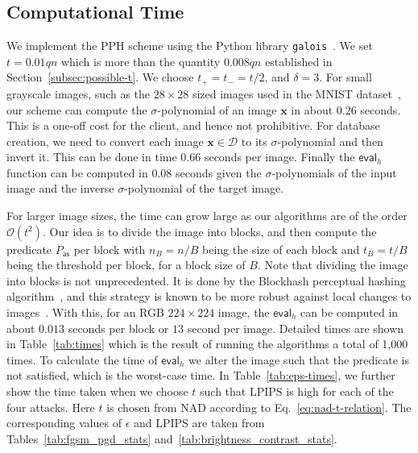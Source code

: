 \documentclass[pdflatex,sn-mathphys-num]{sn-jnl}
\theoremstyle{definition}
\newcommand{\vtr}[1]{\mathbf{#1}}
\newcommand{\database}{\mathcal{D}}
\begin{document}
\subsection{Computational Time}
We implement the PPH scheme using the Python library \verb+galois+~\cite{Hostetter_Galois_2020}. We set $t = 0.01qn$ which is more than the quantity $0.008qn$ established in Section~\ref{subsec:possible-t}. We choose $t_+ = t_- = t/2$, and $\delta = 3$. For small grayscale images, such as the $28 \times 28$ sized images used in the MNIST dataset~\cite{lecun1998mnist}, our scheme can compute the $\sigma$-polynomial of an image $\vtr{x}$ in about $0.26$ seconds. This is a one-off cost for the client, and hence not prohibitive. For database creation, we need to convert each image $\vtr{x} \in \database$ to its $\sigma$-polynomial and then invert it. This can be done in time $0.66$ seconds per image. Finally the $\mathsf{eval}_h$ function can be computed in $0.08$ seconds given the $\sigma$-polynomials of the input image and the inverse $\sigma$-polynomial of the target image. 

For larger image sizes, the time can grow large as our algorithms are of the order $\mathcal{O}(t^2)$. Our idea is to divide the image into blocks, and then compute the predicate $P_{\mathsf{as}}$ per block with $n_B = n/B$ being the size of each block and $t_B = t/B$ being the threshold per block, for a block size of $B$. Note that dividing the image into blocks is not unprecedented. It is done by the 
Blockhash perceptual hashing algorithm~\cite{yang2006block}, and this strategy is known to be more robust against local changes to images~\cite{schneider1996robustblock, hao2021pph-attack}. With this, for an RGB $224 \times 224$ image, the $\mathsf{eval}_h$ can be computed in about $0.013$ seconds per block or $13$ second per image. Detailed times are shown in Table~\ref{tab:times} which is the result of running the algorithms a total of 1,000 times. To calculate the time of $\mathsf{eval}_h$ we alter the image such that the predicate is not satisfied, which is the worst-case time. In Table~\ref{tab:eps-times}, we further show the time taken when we choose $t$ such that LPIPS is high for each of the four attacks. Here $t$ is chosen from NAD according to Eq.~\ref{eq:nad-t-relation}. The corresponding values of $\epsilon$ and LPIPS are taken from Tables~\ref{tab:fgsm_pgd_stats} and~\ref{tab:brightness_contrast_stats}.
\end{document}
